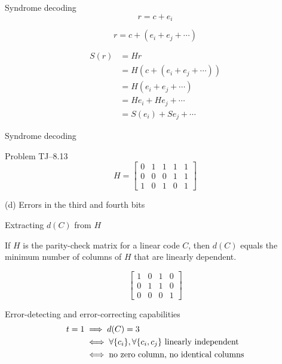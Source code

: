 \begin{frame}{Syndrome decoding}
  \[
	r = c + e_i
  \]

  \[
	r = c + (e_{i} + e_{j} + \cdots)
  \]

  \begin{definition}[Syndrome]
	\begin{align*}
	  S(r) &= H r \\
	  	&= H(c + (e_{i} + e_{j} + \cdots)) \\
		&= H (e_{i} + e_{j} + \cdots) \\
		&= H e_{i} + H e_{j} + \cdots \\
		&= S(e_i) + S{e_{j}} + \cdots
	\end{align*}
  \end{definition}
\end{frame}
\begin{frame}{Syndrome decoding}
  \begin{exampleblock}{Problem TJ--8.13}
	\[
	  H = \begin{bmatrix}
		0 & 1 & 1 & 1 & 1 \\
		0 & 0 & 0 & 1 & 1 \\
		1 & 0 & 1 & 0 & 1
	  \end{bmatrix}
	\]

	\centerline{(d) Errors in the third and fourth bits}
  \end{exampleblock}
\end{frame}
\begin{frame}{Extracting $d(C)$ from $H$}
  \begin{theorem}[]
	If $H$ is the parity-check matrix for a linear code $C$, then
	$d(C)$ equals the minimum number of columns of $H$ that are linearly dependent.
  \end{theorem}

  \[
	\begin{bmatrix}
	  1 & 0 & 1 & 0 \\
	  0 & 1 & 1 & 0 \\
	  0 & 0 & 0 & 1
	\end{bmatrix}
  \]
\end{frame}
\begin{frame}{Error-detecting and error-correcting capabilities}
  \begin{align*}
	t = 1 & \implies d(C) = 3 \\
	  &\iff \forall \{c_i\}, \forall \{c_i, c_j\} \text{ linearly independent} \\
	  &\iff \text{no zero column, no identical columns}
  \end{align*}
\end{frame}
